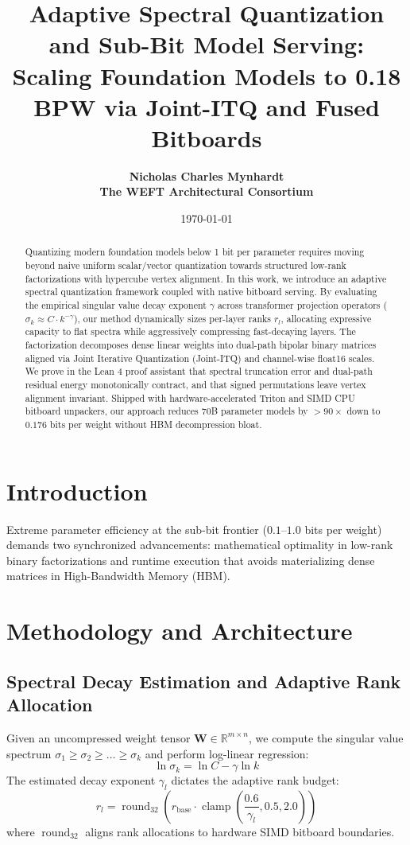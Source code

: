 \documentclass[11pt,a4paper]{article}
\title{\textbf{Adaptive Spectral Quantization and Sub-Bit Model Serving: Scaling Foundation Models to 0.18 BPW via Joint-ITQ and Fused Bitboards}}
\author{
  \textbf{Nicholas Charles Mynhardt} \\
  \textbf{The WEFT Architectural Consortium}
}
\date{\today}
\begin{document}
\maketitle

\begin{abstract}
Quantizing modern foundation models below 1 bit per parameter requires moving beyond naive uniform scalar/vector quantization towards structured low-rank factorizations with hypercube vertex alignment. In this work, we introduce an adaptive spectral quantization framework coupled with native bitboard serving. By evaluating the empirical singular value decay exponent $\gamma$ across transformer projection operators ($\sigma_k \approx C \cdot k^{-\gamma}$), our method dynamically sizes per-layer ranks $r_l$, allocating expressive capacity to flat spectra while aggressively compressing fast-decaying layers. The factorization decomposes dense linear weights into dual-path bipolar binary matrices aligned via Joint Iterative Quantization (Joint-ITQ) and channel-wise float16 scales. We prove in the Lean 4 proof assistant that spectral truncation error and dual-path residual energy monotonically contract, and that signed permutations leave vertex alignment invariant. Shipped with hardware-accelerated Triton and SIMD CPU bitboard unpackers, our approach reduces 70B parameter models by $>90\times$ down to $0.176$ bits per weight without HBM decompression bloat.
\end{abstract}

\section{Introduction}
Extreme parameter efficiency at the sub-bit frontier ($0.1$--$1.0$ bits per weight) demands two synchronized advancements: mathematical optimality in low-rank binary factorizations and runtime execution that avoids materializing dense matrices in High-Bandwidth Memory (HBM).

\section{Methodology and Architecture}

\subsection{Spectral Decay Estimation and Adaptive Rank Allocation}
Given an uncompressed weight tensor $\mathbf{W} \in \mathbb{R}^{m \times n}$, we compute the singular value spectrum $\sigma_1 \ge \sigma_2 \ge \dots \ge \sigma_k$ and perform log-linear regression:
\begin{equation}
\ln \sigma_k = \ln C - \gamma \ln k
\end{equation}
The estimated decay exponent $\gamma_l$ dictates the adaptive rank budget:
\begin{equation}
r_l = \operatorname{round}_{32}\left( r_{\text{base}} \cdot \operatorname{clamp}\left( \frac{0.6}{\gamma_l}, 0.5, 2.0 \right) \right)
\end{equation}
where $\operatorname{round}_{32}$ aligns rank allocations to hardware SIMD bitboard boundaries.
\end{document}
